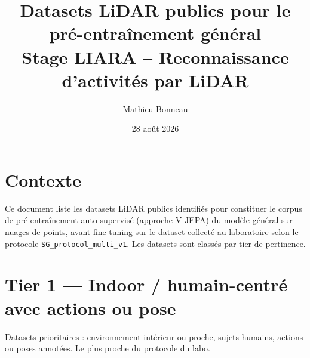 \documentclass[11pt]{article}
\title{Datasets LiDAR publics pour le pré-entraînement général \\
\large Stage LIARA -- Reconnaissance d'activités par LiDAR}
\author{Mathieu Bonneau}
\date{28 août 2026}
\begin{document}
\maketitle

\section*{Contexte}

Ce document liste les datasets LiDAR publics identifiés pour constituer le corpus de
pré-entraînement auto-supervisé (approche V-JEPA) du modèle général sur nuages de points,
avant fine-tuning sur le dataset collecté au laboratoire selon le protocole
\texttt{SG\_protocol\_multi\_v1}. Les datasets sont classés par tier de pertinence.

\footnotesize

\section{Tier 1 --- Indoor / humain-centré avec actions ou pose}
\label{sec:tier1}

Datasets prioritaires : environnement intérieur ou proche, sujets humains, actions ou poses
annotées. Le plus proche du protocole du labo.
\end{document}
